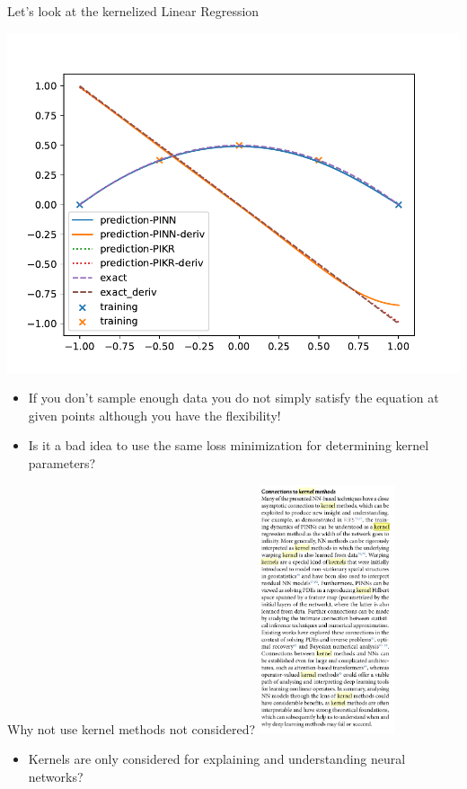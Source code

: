 \documentclass[aspectratio=169]{beamer}
\begin{document}
\begin{frame}{Let's look at the kernelized Linear Regression}
\begin{minipage}{0.3\textwidth}
    \includegraphics[width=\textwidth]{pinn-5.pdf}
  \end{minipage}
  \begin{itemize}
    \item If you don't sample enough data you do not simply satisfy the equation at given points although you have the flexibility!
    \item Is it a bad idea to use the same loss minimization for determining kernel parameters?
  \end{itemize}
\end{frame}

\begin{frame}{Why not use kernel methods not considered?}
  \centering
    \includegraphics[width=0.3\textwidth]{kernel.png}
    \begin{itemize}
      \item Kernels are only considered for explaining and understanding neural networks?
    \end{itemize}
\end{frame}
\end{document}
